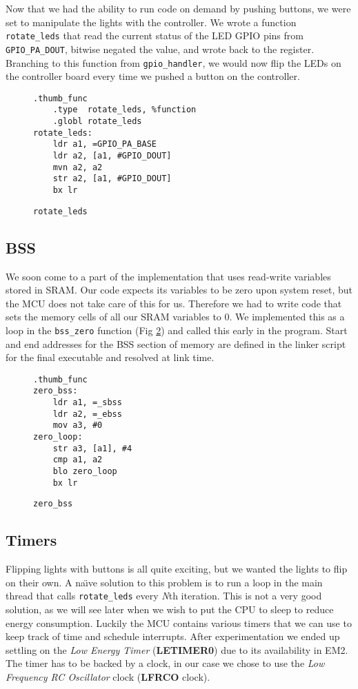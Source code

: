 Now that we had the ability to run code on demand by pushing buttons, we were
set to manipulate the lights with the controller. We wrote a function {\tt
rotate\_leds} that read the current status of the LED GPIO pins from {\tt
GPIO\_PA\_DOUT}, bitwise negated the value, and wrote back to the register.
Branching to this function from {\tt gpio\_handler}, we would now flip the LEDs
on the controller board every time we pushed a button on the controller.

\begin{figure}[h]
	\caption{\texttt{rotate\_leds}}
	\label{code:rotate_leds}
	\begin{lstlisting}[frame=single]
	.thumb_func
	.type  rotate_leds, %function
	.globl rotate_leds
rotate_leds:
	ldr a1, =GPIO_PA_BASE
	ldr a2, [a1, #GPIO_DOUT]
	mvn a2, a2
	str a2, [a1, #GPIO_DOUT]
	bx lr
	\end{lstlisting}
\end{figure}

\subsection{BSS}

We soon come to a part of the implementation that uses read-write variables
stored in SRAM. Our code expects its variables to be zero upon system reset, but
the MCU does not take care of this for us. Therefore we had to write code that
sets the memory cells of all our SRAM variables to 0. We implemented this as a
loop in the {\tt bss\_zero} function (Fig \ref{code:zero_bss}) and called this
early in the program. Start and end addresses for the BSS section of memory are
defined in the linker script for the final executable and resolved at link time.

\begin{figure}[h]
	\caption{\texttt{zero\_bss}}
	\label{code:zero_bss}
	\begin{lstlisting}[frame=single]
	.thumb_func
zero_bss:
	ldr a1, =_sbss
	ldr a2, =_ebss
	mov a3, #0
zero_loop:
	str a3, [a1], #4
	cmp a1, a2
	blo zero_loop
	bx lr
	\end{lstlisting}
\end{figure}

\subsection{Timers}

Flipping lights with buttons is all quite exciting, but we wanted the lights to
flip on their own. A na\"{\i}ve solution to this problem is to run a loop in the
main thread that calls {\tt rotate\_leds} every \textit{N}th iteration. This is
not a very good solution, as we will see later when we wish to put the CPU to
sleep to reduce energy consumption. Luckily the MCU contains various timers that
we can use to keep track of time and schedule interrupts. After experimentation
we ended up settling on the \emph{Low Energy Timer} (\textbf{LETIMER0}) due to
its availability in EM2. The timer has to be backed by a clock, in our case we
chose to use the \emph{Low Frequency RC Oscillator} clock (\textbf{LFRCO}
clock).

